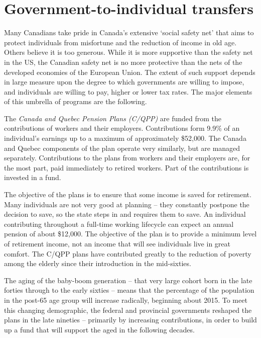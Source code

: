\section{Government-to-individual transfers}\label{sec:ch14sec4}

Many Canadians take pride in Canada's extensive `social safety net' that
aims to protect individuals from misfortune and the reduction of income in
old age. Others believe it is too generous. While it is more supportive than
the safety net in the US, the Canadian safety net is no more protective than
the nets of the developed economies of the European Union. The extent of
such support depends in large measure upon the degree to which governments
are willing to impose, and individuals are willing to pay, higher or lower
tax rates. The major elements of this umbrella of programs are the following.

The \textit{Canada and Quebec Pension Plans (C/QPP)} are funded from
the contributions of workers and their employers. Contributions form 9.9\%
of an individual's earnings up to a maximum of approximately \$52,000. The
Canada and Quebec components of the plan operate very similarly, but are
managed separately. Contributions to the plans from workers and their
employers are, for the most part, paid immediately to retired workers. Part
of the contributions is invested in a fund.

The objective of the plans is to ensure that some income is saved for
retirement. Many individuals are not very good at planning -- they
constantly postpone the decision to save, so the state steps in and requires
them to save. An individual contributing throughout a full-time working
lifecycle can expect an annual pension of about \$12,000. The objective of
the plan is to provide a minimum level of retirement income, not an income
that will see individuals live in great comfort. The C/QPP plans have
contributed greatly to the reduction of poverty among the elderly since
their introduction in the mid-sixties.

The aging of the baby-boom generation -- that very large cohort born in the
late forties through to the early sixties -- means that the percentage of
the population in the post-65 age group will increase radically, beginning
about 2015. To meet this changing demographic, the federal and provincial
governments reshaped the plans in the late nineties -- primarily by
increasing contributions, in order to build up a fund that will support the
aged in the following decades. 

